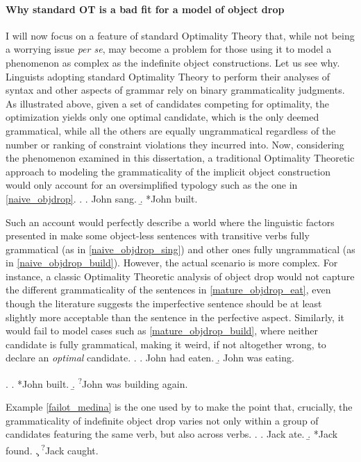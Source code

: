 \paragraph{Why standard OT is a bad fit for a model of object drop} 
I will now focus on a feature of standard Optimality Theory that, while not being a worrying issue \textit{per se}, may become a problem for those using it to model a phenomenon as complex as the indefinite object constructions. Let us see why.\\
Linguists adopting standard Optimality Theory to perform their analyses of syntax and other aspects of grammar rely on binary grammaticality judgments. As illustrated above, given a set of candidates competing for optimality, the optimization yields only one optimal candidate, which is the only deemed grammatical, while all the others are equally ungrammatical regardless of the number or ranking of constraint violations they incurred into. Now, considering the phenomenon examined in this dissertation, a traditional Optimality Theoretic approach to modeling the grammaticality of the implicit object construction would only account for an oversimplified typology such as the one in \ref{naive_objdrop}. 
\ex. \label{naive_objdrop} \a. \label{naive_objdrop_sing} John sang.
\b. \label{naive_objdrop_build} *John built.

Such an account would perfectly describe a world where the linguistic factors presented in  make some object-less sentences with transitive verbs fully grammatical (as in \ref{naive_objdrop_sing}) and other ones fully ungrammatical (as in \ref{naive_objdrop_build}). However, the actual scenario is more complex. For instance, a classic Optimality Theoretic analysis of object drop would not capture the different grammaticality of the sentences in \ref{mature_objdrop_eat}, even though the literature suggests the imperfective sentence should be at least slightly more acceptable than the sentence in the perfective aspect. Similarly, it would fail to model cases such as \ref{mature_objdrop_build}, where neither candidate is fully grammatical, making it weird, if not altogether wrong, to declare an \textit{optimal} candidate.
\ex. \label{mature_objdrop_eat} \a. John had eaten.
\b. John was eating.

\ex. \label{mature_objdrop_build} \a. *John built.
\b. \textsuperscript{?}John was building again.

Example \ref{failot_medina} is the one used by \textcite[62]{Medina2007} to make the point that, crucially, the grammaticality of indefinite object drop varies not only within a group of candidates featuring the same verb, but also across verbs.
\ex. \label{failot_medina} \a. Jack ate.
\b. *Jack found.
\c. \textsuperscript{?}Jack caught.

